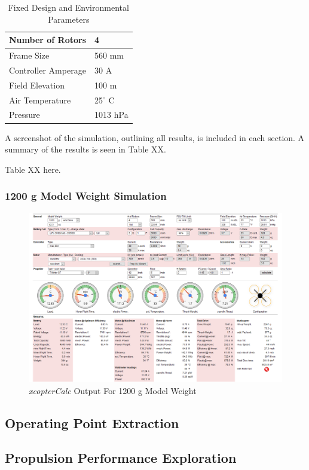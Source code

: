 \begin{table}[H]
\label{env_param}
\centering
\begin{tabular}{|l|l|}
\hline
Number of Rotors    & 4        \\ \hline
Frame Size          & 560 mm   \\ \hline
Controller Amperage & 30 A     \\ \hline
Field Elevation     & 100 m    \\ \hline
Air Temperature     & 25$^{\circ}$ C     \\ \hline
Pressure            & 1013 hPa \\ \hline
\end{tabular}
\caption{Fixed Design and Environmental Parameters}
\end{table}

A screenshot of the simulation, outlining all results, is included in each section. A summary of the results is seen in Table XX.

Table XX here.

\subsubsection{1200 g Model Weight Simulation}

\begin{figure}[H]
\centering
\includegraphics[width=16.5cm]{img/1200g_sim.png}
\caption{\textit{xcopterCalc} Output For 1200 g Model Weight}
\end{figure} 



\subsection{Operating Point Extraction}

\subsection{Propulsion Performance Exploration}
\label{prop_explore}